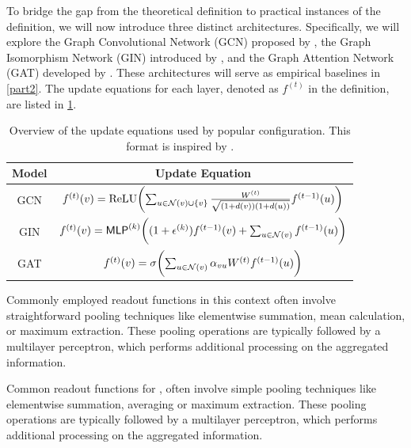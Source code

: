 To bridge the gap from the theoretical definition to practical instances of the definition, we will now introduce three distinct \gnn architectures. Specifically, we will explore the \textsf{Graph Convolutional Network (GCN)} proposed by \cite{Kip+2017}, the \textsf{Graph Isomorphism Network (GIN)} introduced by \cite{Xu2018}, and the \textsf{Graph Attention Network (GAT)} developed by \cite{Velivckovic2017}. These architectures will serve as empirical baselines in \cref{part2}. The update equations for each \gnn layer, denoted as $f^{(t)}$ in the definition, are listed in \cref{tab:models}.

\begin{table}[h]
    \centering
    \begin{tabular}{ c|c }
        \textbf{Model} & \textbf{Update Equation}\\
        \hline
        GCN & $f^{(t)}(v) = \text{ReLU}\biggl( \sum_{u \in \mathcal{N}(v) \cup \{v\}} \frac{W^{(t)}}{\sqrt{(1 + d(v))(1 + d(u))}} f^{(t-1)}(u)\biggr)$ \\
        \hline
        GIN & $f^{(t)}(v) = \textsf{MLP}^{(k)} \biggl( (1 + \epsilon^{(k)}) f^{(t-1)}(v) + \sum_{u \in \mathcal{N}(v)} f^{(t-1)}(u)\biggr)$\\
        \hline
        GAT & $f^{(t)}(v) = \sigma \biggl( \sum_{u \in \mathcal{N}(v)} \alpha_{vu} W^{(t)} f^{(t-1)}(u) \biggr)$
    \end{tabular}
    \caption{Overview of the update equations used by popular \gnn configuration. This format is inspired by \cite{Nikolentzos2023}.}
    \label{tab:models}
\end{table}

Commonly employed readout functions in this context often involve straightforward pooling techniques like elementwise summation, mean calculation, or maximum extraction. These pooling operations are typically followed by a multilayer perceptron, which performs additional processing on the aggregated information.

Common readout functions for \gnns, often involve simple pooling techniques like elementwise summation, averaging or maximum extraction. These pooling operations are typically followed by a multilayer perceptron, which performs additional processing on the aggregated information. %

